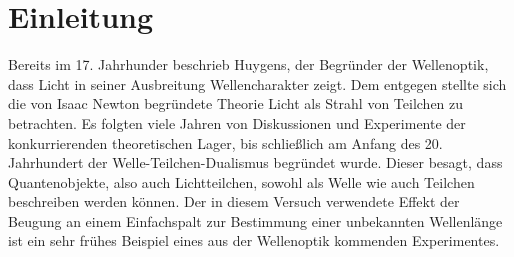 \section{Einleitung}



Bereits im 17. Jahrhunder beschrieb Huygens, der Begründer der Wellenoptik, dass Licht in seiner Ausbreitung Wellencharakter zeigt. Dem entgegen stellte sich die von Isaac Newton begründete Theorie Licht als Strahl von Teilchen zu betrachten. Es folgten viele Jahren von Diskussionen und Experimente der konkurrierenden theoretischen Lager, bis schließlich am Anfang des 20. Jahrhundert der Welle-Teilchen-Dualismus begründet wurde. Dieser besagt, dass Quantenobjekte, also auch Lichtteilchen, sowohl als Welle wie auch Teilchen beschreiben werden können. Der in diesem Versuch verwendete Effekt der Beugung an einem Einfachspalt zur Bestimmung einer unbekannten Wellenlänge ist ein sehr frühes Beispiel eines aus der Wellenoptik kommenden Experimentes.
